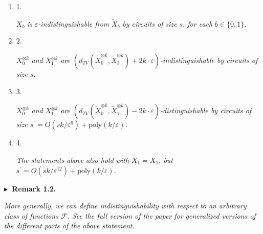 \begin{enumerate}


\item[] 
1. 


$X_{b}$\emph{ is }$\varepsilon$\emph{-indistinguishable from }$\widetilde{X}_{b}$\emph{ by circuits of size }$s$\emph{, for each }$b\in\{0,1\}$\emph{.}\par





\item[] 
2. 


$X_{0}^{\otimes k}$\emph{ and }$X_{1}^{\otimes k}$\emph{ are }$(d_{TV}(\widetilde{X}_{0}^{\otimes k},\widetilde{X}_{1}^{\otimes k})+2k\cdot\varepsilon)$\emph{-indistinguishable by circuits of size }$s$\emph{.}\par





\item[] 
3. 


$X_{0}^{\otimes k}$\emph{ and }$X_{1}^{\otimes k}$\emph{ are }$(d_{TV}(\widetilde{X}_{0}^{\otimes k},\widetilde{X}_{1}^{\otimes k})-2k\cdot\varepsilon)$\emph{-distinguishable by circuits of size }$s^{\prime}=O(sk/\varepsilon^{6})+\text{poly}(k/\varepsilon)$\emph{.}\par





\item[] 
4. 


\emph{The statements above also hold with }$\widetilde{X}_{1}=X_{1}$\emph{, but }$s^{\prime}=O(sk/\varepsilon^{12})+\text{poly}(k/\varepsilon)$\emph{.}\par





\end{enumerate}







\par\medskip\noindent\textbf{
$\blacktriangleright$ Remark 1.2.
}\par



\emph{More generally, we can define indistinguishability with respect to an arbitrary class of functions $\mathcal{F}$. See the full version of the paper for generalized versions of the different parts of the above statement.}\par



